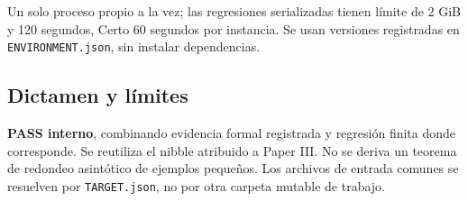 \documentclass[11pt]{article}
\begin{document}
Un solo proceso propio a la vez; las regresiones serializadas tienen
límite de 2 GiB y 120 segundos, Certo 60 segundos por instancia. Se usan
versiones registradas en \nolinkurl{ENVIRONMENT.json}, sin instalar
dependencias.

\subsection{Dictamen y límites}\label{dictamen-y-luxedmites}

\textbf{PASS interno}, combinando evidencia formal registrada y
regresión finita donde corresponde. Se reutiliza el nibble atribuido a
Paper III. No se deriva un teorema de redondeo asintótico de ejemplos
pequeños. Los archivos de entrada comunes se resuelven por
\nolinkurl{TARGET.json}, no por otra carpeta mutable de trabajo.
\end{document}
